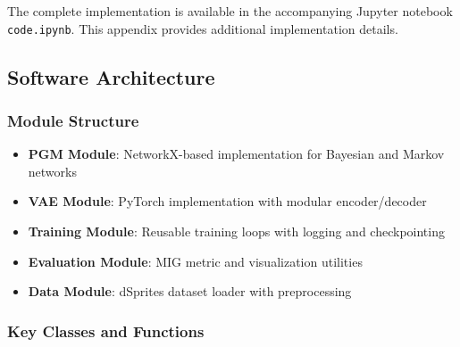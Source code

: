 \documentclass[conference]{IEEEtran}
\begin{document}
The complete implementation is available in the accompanying Jupyter notebook \texttt{code.ipynb}. This appendix provides additional implementation details.

\subsection{Software Architecture}

\subsubsection{Module Structure}
\begin{itemize}
    \item \textbf{PGM Module}: NetworkX-based implementation for Bayesian and Markov networks
    \item \textbf{VAE Module}: PyTorch implementation with modular encoder/decoder
    \item \textbf{Training Module}: Reusable training loops with logging and checkpointing
    \item \textbf{Evaluation Module}: MIG metric and visualization utilities
    \item \textbf{Data Module}: dSprites dataset loader with preprocessing
\end{itemize}

\subsubsection{Key Classes and Functions}
\end{document}
